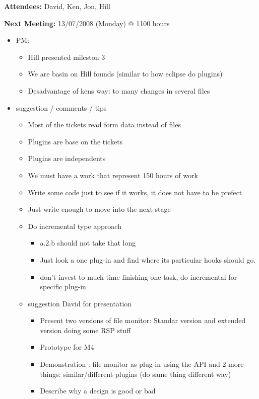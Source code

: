 \documentclass{letter}
\begin{document}
\textbf{Attendees:} David, Ken, Jon, Hill

\textbf{Next Meeting:} 13/07/2008 (Monday) @ 1100 hours

\begin{itemize}
 \item PM:
        \begin{itemize}
        \item Hill presented mileston 3
        \item We are basin on Hill founds (similar to how eclipse do plugins)
        \item Desadvantage of kens way: to many changes in several files
        \end{itemize}
 \item suggestion / comments / tips
       \begin{itemize}
        \item Most of the tickets read form data instead of files
        \item Plugins are base on the tickets
        \item Plugins are independents
        \item We must have a work that represent 150 hours of work
        \item Write some code just to see if it works, it does not have to be prefect
        \item Just write enough to move into the next stage
        \item Do incremental type approach
            \begin{itemize}
            \item a.2.b should not take that long
            \item Just look a one plug-in and find where its particular hooks should go.
            \item don't invest to much time finishing one task, do incremental for specific plug-in
            \end{itemize}
  
         
       \item suggestion David for presentation
            \begin{itemize}
            \item Present two versions of file monitor: Standar version and extended version doing some RSP stuff
            \item Prototype for M4
            \item Demonstration : file monitor as plug-in using the API and 2 more things: similar/different plugins (do same thing different way)
            \item Describe why a design is good or bad
            \end{itemize}
      \end{itemize}


\end{itemize}
\end{document}
